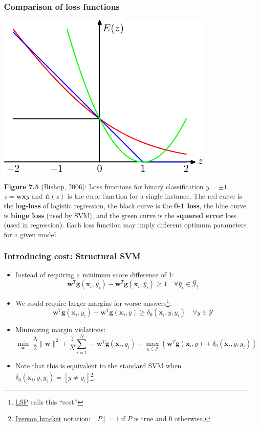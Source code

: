 \documentclass[ignorenonframetext,plain,fleqn]{beamer}
\renewcommand{\vec}{\mathbf}
\begin{document}
\begin{frame}\frametitle{Comparison of loss functions}
\begin{center}
\includegraphics[height=.5\textheight]{images/bishop-fig-7-5.pdf}
\end{center}\footnotesize
{\bf Figure 7.5}
(\href{http://research.microsoft.com/en-us/um/people/cmbishop/prml}
{Bishop, 2006}): Loss functions for binary classification $y=\pm 1$.
$z=\mathbf{w}\mathbf{x}y$ and $E(z)$ is the error function for a
single instance.  The red curve is the {\bf log-loss} of logistic
regression, the black curve is the {\bf 0-1 loss}, the blue curve is
{\bf hinge loss} (used by SVM), and the green curve is the {\bf
  squared error} loss (used in regression).  Each loss function may
imply different optimum parameters for a given model.
\end{frame}


\begin{frame}\frametitle{Introducing cost: Structural SVM}
\begin{itemize}
\item Instead of requiring a minimum score difference of 1:
\[
  \vec{w}^T\vec{g}(\vec{x}_i,y_i) -
  \vec{w}^T\vec{g}(\vec{x}_i,\bar{y}_i) \geq 1\quad
  \forall \bar{y}_i \in \bar{\mathcal{Y}_i}
\]
\item We could require larger margins for worse answers\footnote{
  \href{http://www.morganclaypool.com/doi/abs/10.2200/S00361ED1V01Y201105HLT013}{LSP}
  calls this ``cost''}: \[
  \vec{w}^T\vec{g}(\vec{x}_i,y_i) -
  \vec{w}^T\vec{g}(\vec{x}_i,y) \geq \delta_0(\vec{x}_i,y,y_i)\quad
  \forall y \in \mathcal{Y}
\]
\item Minimizing margin violations: \[
\min_\vec{w}\; 
 \frac{\lambda}{2} \|\vec{w}\|^2
+ \frac{1}{N} \sum_{i=1}^N 
-  \vec{w}^T\vec{g}(\vec{x}_i,y_i) + \max_{y\in\mathcal{Y}}
(  \vec{w}^T\vec{g}(\vec{x}_i,y) + \delta_0(\vec{x}_i,y,y_i))
\]
\item Note that this is equivalent to the standard SVM when
  $\delta_0(\vec{x}_i,y,y_i)=[y\neq y_i]$\footnote{
  \href{http://en.wikipedia.org/wiki/Iverson_bracket}{Iverson bracket}
  notation: $[P]=1$ if $P$ is true and 0 otherwise.}.
\end{itemize}
\end{frame}
\end{document}
